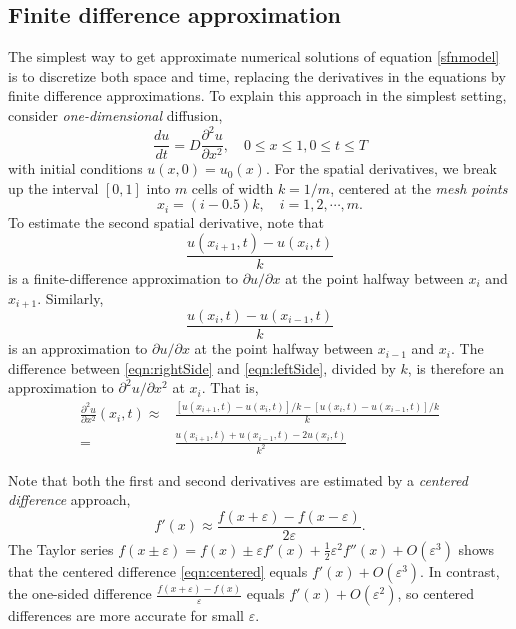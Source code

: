 \documentclass [11pt]{article}
\numberwithin{exercise}{section}
\begin{document}
\subsection{Finite difference approximation}
The simplest way to get approximate numerical solutions of equation \eqref{sfnmodel} is to 
discretize both space and time, replacing the derivatives in the equations by finite difference approximations. 
To explain this approach in the simplest setting, consider \emph{one-dimensional} diffusion, 
\begin{equation}
\frac{du}{dt} = D \frac{\partial^2 u}{\partial x^2}, \quad 0 \le x \le 1, 0 \le t \le T
\label{eqn:1D}
\end{equation}
with initial conditions $u(x,0)=u_0(x)$. For the spatial derivatives, we break up the interval $[0,1]$ 
into $m$ cells of width $k=1/m$, centered at the \emph{mesh points} 
$$ x_i = (i - 0.5)k, \quad i=1,2,\cdots, m. $$ 
To estimate the second spatial derivative, note that 
\begin{equation} 
\frac{u(x_{i+1},t) - u(x_{i},t)}{k} 
\label{eqn:rightSide}
\end{equation} 
is a finite-difference approximation to $\partial u/\partial x$ at the point halfway between $x_i$ and $x_{i+1}$. 
Similarly, 
\begin{equation} 
\frac{u(x_{i},t) - u(x_{i-1},t)}{k} 
\label{eqn:leftSide}
\end{equation} 
is an approximation to $\partial u/\partial x$ at the point halfway between $x_{i-1}$ and $x_i$. 
The difference between \eqref{eqn:rightSide} and \eqref{eqn:leftSide}, divided by $k$, is therefore an approximation 
to $\partial^2 u/\partial x^2$ at $x_i$. That is,  
\begin{equation}
\begin{aligned} 
\frac{\partial^2 u}{\partial x^2}(x_i,t) \approx 
& \frac{[u(x_{i+1},t)- u(x_i,t)]/k - [u(x_{i},t) - u(x_{i-1},t)]/k}{k} \\
= & \frac{u(x_{i+1},t) + u(x_{i-1},t) - 2u(x_i,t)}{k^2} 
\end{aligned} 
\label{eqn:2ndDeriv}
\end{equation} 

Note that both the first and second derivatives are estimated by a \emph{centered difference} approach, 
\begin{equation}
f'(x) \approx \frac{f(x+\varepsilon)-f(x-\varepsilon)}{2 \varepsilon}. 
\label{eqn:centered}
\end{equation}
The Taylor series $f(x \pm \varepsilon) = f(x) \pm \varepsilon f'(x) + \frac{1}{2}\varepsilon^2 f''(x) + O(\varepsilon^3)$ 
shows that the centered difference \eqref{eqn:centered} equals $f'(x) + O(\varepsilon^3)$. In contrast, the  
one-sided difference $\frac{f(x+\varepsilon)-f(x)}{\varepsilon}$ equals $f'(x) + O(\varepsilon^2)$, so 
centered differences are more accurate for small $\varepsilon$. 
\end{document}
